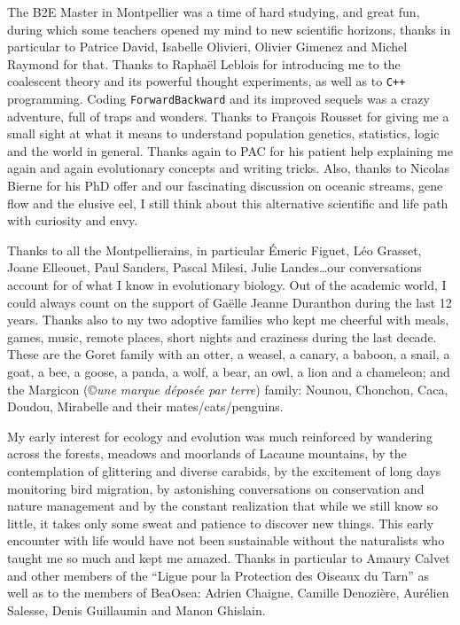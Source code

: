 The B2E Master in Montpellier was a time of hard studying, and great fun, during which some teachers opened my mind to new scientific horizons, thanks in particular to Patrice David, Isabelle Olivieri, Olivier Gimenez and Michel Raymond for that.
Thanks to Rapha\"{e}l Leblois for introducing me to the coalescent theory and its powerful thought experiments, as well as to \texttt{C++} programming. Coding \texttt{ForwardBackward} and its improved sequels was a crazy adventure, full of traps and wonders. Thanks to Fran\c{c}ois Rousset for giving me a small sight at what it means to understand population genetics, statistics, logic and the world in general.
Thanks again to PAC for his patient help explaining me again and again evolutionary concepts and writing tricks.
Also, thanks to Nicolas Bierne for his PhD offer and our fascinating discussion on oceanic streams, gene flow and the elusive eel, I still think about this alternative scientific and life path with curiosity and envy. 

Thanks to all the Montpellierains, in particular \'{E}meric Figuet, L\'{e}o Grasset, Joane Elleouet, Paul Sanders, Pascal Milesi, Julie Landes\dots our conversations account for of what I know in evolutionary biology.
Out of the academic world, I could always count on the support of Ga\"elle Jeanne Duranthon during the last 12 years. Thanks also to my two adoptive families who kept me cheerful with meals, games, music, remote places, short nights and craziness during the last decade. These are the Goret family with an otter, a weasel, a canary, a baboon, a snail, a goat, a bee, a goose, a panda, a wolf, a bear, an owl, a lion and a chameleon; and the Margicon (\copyright \textit{une marque d\'{e}pos\'{e}e par terre}) family: Nounou, Chonchon, Caca, Doudou, Mirabelle and their mates/cats/penguins.

My early interest for ecology and evolution was much reinforced by wandering across the forests, meadows and moorlands of Lacaune mountains, by the contemplation of glittering and diverse carabids, by the excitement of long days monitoring bird migration, by astonishing conversations on conservation and nature management and by the constant realization that while we still know so little, it takes only some sweat and patience to discover new things.
This early encounter with life would have not been sustainable without the naturalists who taught me so much and kept me amazed. Thanks in particular to Amaury Calvet and other members of the ``Ligue pour la Protection des Oiseaux du Tarn'' as well as to the members of BeaOsea: Adrien Chaigne, Camille Denozi\`{e}re, Aur\'{e}lien Salesse, Denis Guillaumin and Manon Ghislain.

